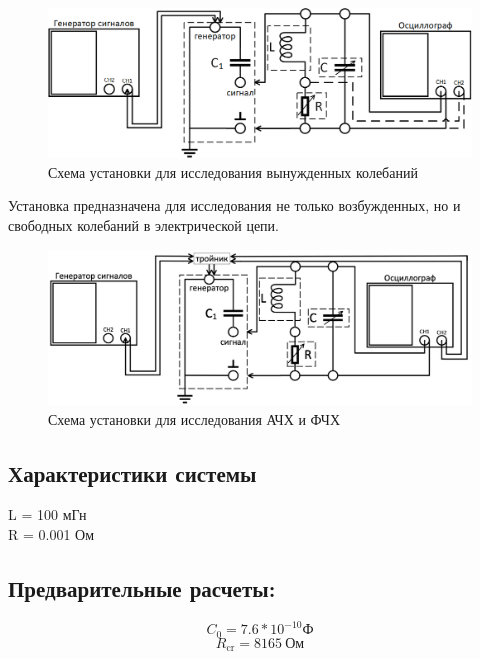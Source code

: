 \documentclass[
a4paper, %
12pt, %
]{article}
\begin{document}
	\begin{figure}[h]
		\centering
		\includegraphics[scale=0.4]{img/electrical_circuit}
		\caption{Схема установки для исследования вынужденных колебаний}
		\label{fig:electricalcircuit}
	\end{figure}
	
	\noindent
	Установка предназначена для исследования не только возбужденных, но и свободных колебаний в электрической цепи.
	
	\begin{figure}[h]
		\centering
		\includegraphics[width=0.90\linewidth]{img/PhaseAmplCharCircuit}
		\caption{Схема установки для исследования АЧХ и ФЧХ}
		\label{fig:phaseamplcharcircuit}
	\end{figure}
	
	\newpage
	
	\subsection{Характеристики системы}
	
	L = 100 мГн\\
	R = 0.001 Ом
	
	\subsection{Предварительные расчеты:}
	\begin{equation}
		C_0 = 7.6 * 10^{-10} \text{Ф}
	\end{equation}
	\begin{equation}
		R_{\text{cr}} = 8165 \:\text{Ом}
	\end{equation}
\end{document}
